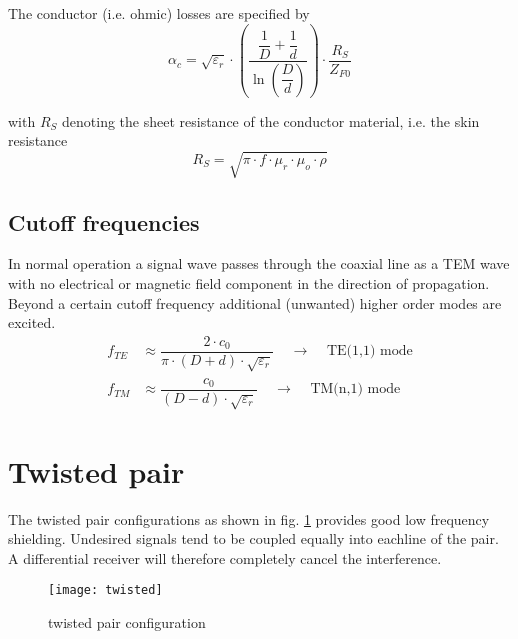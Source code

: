 The conductor (i.e. ohmic) losses are specified by
\begin{equation}
\alpha_c = \sqrt{\varepsilon_r} \cdot\left(\dfrac{\dfrac{1}{D} + \dfrac{1}{d}}{\ln{\left(\dfrac{D}{d}\right)}}\right)\cdot\dfrac{R_S}{Z_{F0}}
\end{equation}

with $R_S$ denoting the sheet resistance of the conductor material,
i.e. the skin resistance
\begin{equation}
R_S = \sqrt{\pi\cdot f\cdot \mu_r \cdot \mu_o \cdot \rho}
\end{equation}

\subsection{Cutoff frequencies}

In normal operation a signal wave passes through the coaxial line as a
TEM wave with no electrical or magnetic field component in the
direction of propagation.  Beyond a certain cutoff frequency
additional (unwanted) higher order modes are excited.
\begin{align}
f_{TE} &\approx \dfrac{2\cdot c_0}{\pi\cdot\left(D + d\right)\cdot\sqrt{\varepsilon_r}}
\;\;\;\;\rightarrow\;\;\;\; \textrm{TE(1,1) mode}\\
f_{TM} &\approx \dfrac{c_0}{\left(D - d\right)\cdot\sqrt{\varepsilon_r}}
\;\;\;\;\rightarrow\;\;\;\; \textrm{TM(n,1) mode}
\end{align}

\section{Twisted pair}

The twisted pair configurations as shown in fig. \ref{fig:twisted}
provides good low frequency shielding.  Undesired signals tend to be
coupled equally into eachline of the pair.  A differential receiver
will therefore completely cancel the interference.

\begin{figure}[ht]
\begin{center}
\texttt{[image: twisted]}
\end{center}
\caption{twisted pair configuration}
\label{fig:twisted}
\end{figure}
\FloatBarrier

